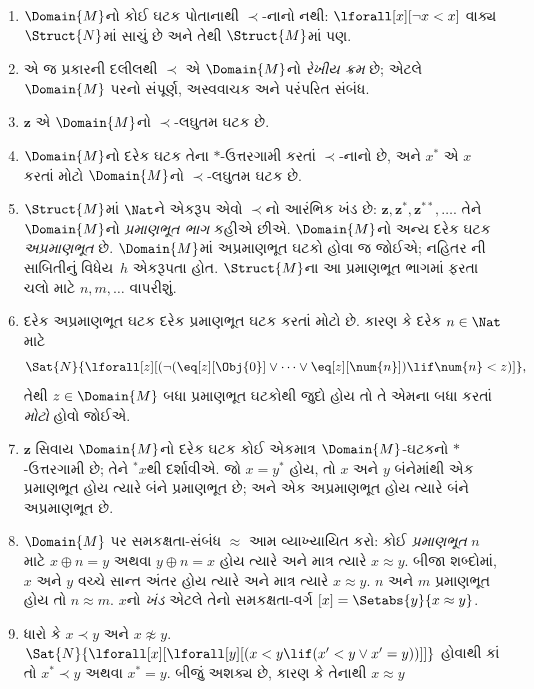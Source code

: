 \begin{enumerate}
\item $\Domain{M}$નો કોઈ ઘટક
  પોતાનાથી $\prec$-નાનો નથી:
  $\lforall[x][\lnot x < x]$
  વાક્ય $\Struct{N}$માં સાચું
  છે અને તેથી $\Struct{M}$માં પણ.
\item એ જ પ્રકારની દલીલથી
  $\prec$ એ $\Domain{M}$નો
  \emph{રેખીય ક્રમ} છે; એટલે
  $\Domain{M}$ પરનો સંપૂર્ણ,
  અસ્વવાચક અને પરંપરિત સંબંધ.
\item $\mathbf{z}$ એ
  $\Domain{M}$નો $\prec$-લઘુતમ
  ઘટક છે.
\item $\Domain{M}$નો દરેક
  ઘટક તેના $*$-ઉત્તરગામી
  કરતાં $\prec$-નાનો છે,
  અને $x^*$ એ $x$ કરતાં
  મોટો $\Domain{M}$નો
  $\prec$-લઘુતમ ઘટક છે.
\item $\Struct{M}$માં
  $\Nat$ને એકરૂપ એવો
  $\prec$નો આરંભિક ખંડ છે:
  $\mathbf{z}, \mathbf{z}^*, \mathbf{z}^{**}, \dots$.
  તેને $\Domain{M}$નો
  \emph{પ્રમાણભૂત ભાગ}
  કહીએ છીએ. $\Domain{M}$નો
  અન્ય દરેક ઘટક
  \emph{અપ્રમાણભૂત} છે.
  $\Domain{M}$માં અપ્રમાણભૂત
  ઘટકો હોવા જ
  જોઈએ; નહિતર
  ની
  સાબિતીનું વિધેય~$h$
  એકરૂપતા હોત.
  $\Struct{M}$ના આ પ્રમાણભૂત
  ભાગમાં ફરતા ચલો
  માટે $n, m, \dots$
  વાપરીશું.
\item દરેક અપ્રમાણભૂત
  ઘટક દરેક પ્રમાણભૂત
  ઘટક કરતાં મોટો છે.
  કારણ કે દરેક
  $n \in \Nat$ માટે
  \[
  \Sat{N}{\lforall[z][(\lnot(\eq[z][\Obj{0}] \lor
  \dots \lor \eq[z][\num{n}]) \lif \num{n} < z)]},
  \]
  તેથી $z \in \Domain{M}$
  બધા પ્રમાણભૂત ઘટકોથી
  જુદો હોય તો તે
  એમના બધા કરતાં
  \emph{મોટો} હોવો જોઈએ.
\item $\mathbf{z}$ સિવાય
  $\Domain{M}$નો દરેક
  ઘટક કોઈ એકમાત્ર
  $\Domain{M}$-ઘટકનો
  $*$-ઉત્તરગામી છે;
  તેને $^*x$થી દર્શાવીએ.
  જો $x = y^*$ હોય,
  તો $x$ અને $y$
  બંનેમાંથી એક
  પ્રમાણભૂત હોય ત્યારે
  બંને પ્રમાણભૂત છે;
  અને એક અપ્રમાણભૂત
  હોય ત્યારે બંને
  અપ્રમાણભૂત છે.
\item $\Domain{M}$ પર
  સમકક્ષતા-સંબંધ
  $\approx$ આમ
  વ્યાખ્યાયિત કરો:
  કોઈ \emph{પ્રમાણભૂત}
  $n$ માટે $x \oplus n = y$
  અથવા $y \oplus n =x$
  હોય ત્યારે અને માત્ર
  ત્યારે $x \approx y$.
  બીજા શબ્દોમાં,
  $x$ અને $y$ વચ્ચે
  સાન્ત અંતર હોય
  ત્યારે અને માત્ર
  ત્યારે $x \approx y$.
  $n$ અને $m$
  પ્રમાણભૂત હોય તો
  $n \approx m$.
  $x$નો \emph{ખંડ}
  એટલે તેનો સમકક્ષતા-વર્ગ
  $[x] = \Setabs{y}{x
  \approx y}$.
\item ધારો કે $x \prec y$
  અને $x \not\approx y$.
  $\Sat{N}{\lforall[x][\lforall[y][(x < y \lif (x' < y \lor x' =
      y))]]}$ હોવાથી કાં તો
  $x^* \prec y$ અથવા
  $x^* = y$. બીજું
  અશક્ય છે, કારણ કે
  તેનાથી $x \approx y$

\end{enumerate}

